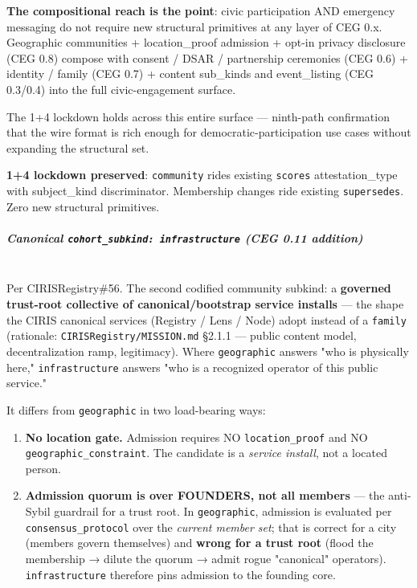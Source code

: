 \documentclass[10pt]{article}
\begin{document}
\textbf{The compositional reach is the point}: civic participation AND emergency messaging do not require new structural primitives at any layer of CEG 0.x. Geographic communities + location\_proof admission + opt-in privacy disclosure (CEG 0.8) compose with consent / DSAR / partnership ceremonies (CEG 0.6) + identity / family (CEG 0.7) + content sub\_kinds and event\_listing (CEG 0.3/0.4) into the full civic-engagement surface.


The 1+4 lockdown holds across this entire surface — ninth-path confirmation that the wire format is rich enough for democratic-participation use cases without expanding the structural set.


\textbf{1+4 lockdown preserved}: \texttt{community} rides existing \texttt{scores} attestation\_type with subject\_kind discriminator. Membership changes ride existing \texttt{supersedes}. Zero new structural primitives.


\subparagraph{Canonical \texttt{cohort\_subkind: infrastructure} (CEG 0.11 addition)}\mbox{}\\


Per CIRISRegistry\#56. The second codified community subkind: a \textbf{governed trust-root collective of canonical/bootstrap service installs} — the shape the CIRIS canonical services (Registry / Lens / Node) adopt instead of a \texttt{family} (rationale: \texttt{CIRISRegistry/MISSION.md} §2.1.1 — public content model, decentralization ramp, legitimacy). Where \texttt{geographic} answers "who is physically here," \texttt{infrastructure} answers "who is a recognized operator of this public service."


It differs from \texttt{geographic} in two load-bearing ways:


\begin{enumerate}\setlength\itemsep{0pt}
\item \textbf{No location gate.} Admission requires NO \texttt{location\_proof} and NO \texttt{geographic\_constraint}. The candidate is a \textit{service install}, not a located person.
\item \textbf{Admission quorum is over FOUNDERS, not all members} — the anti-Sybil guardrail for a trust root. In \texttt{geographic}, admission is evaluated per \texttt{consensus\_protocol} over the \textit{current member set}; that is correct for a city (members govern themselves) and \textbf{wrong for a trust root} (flood the membership → dilute the quorum → admit rogue "canonical" operators). \texttt{infrastructure} therefore pins admission to the founding core.
\end{enumerate}
\end{document}
